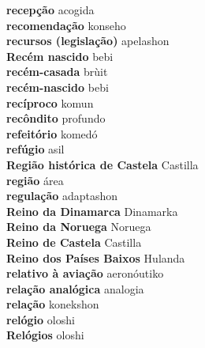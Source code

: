 \textbf{ recepção  } acogida \\
\textbf{ recomendação  } konseho \\
\textbf{ recursos (legislação)  } apelashon \\
\textbf{ Recém nascido  } bebi \\
\textbf{ recém-casada  } brùit \\
\textbf{ recém-nascido  } bebi \\
\textbf{ recíproco  } komun \\
\textbf{ recôndito  } profundo \\
\textbf{ refeitório  } komedó \\
\textbf{ refúgio  } asil \\
\textbf{ Região histórica de Castela  } Castilla \\
\textbf{ região  } área \\
\textbf{ regulação  } adaptashon \\
\textbf{ Reino da Dinamarca  } Dinamarka \\
\textbf{ Reino da Noruega  } Noruega \\
\textbf{ Reino de Castela  } Castilla \\
\textbf{ Reino dos Países Baixos  } Hulanda \\
\textbf{ relativo à aviação  } aeronóutiko \\
\textbf{ relação analógica  } analogia \\
\textbf{ relação  } konekshon \\
\textbf{ relógio  } oloshi \\
\textbf{ Relógios  } oloshi \\
